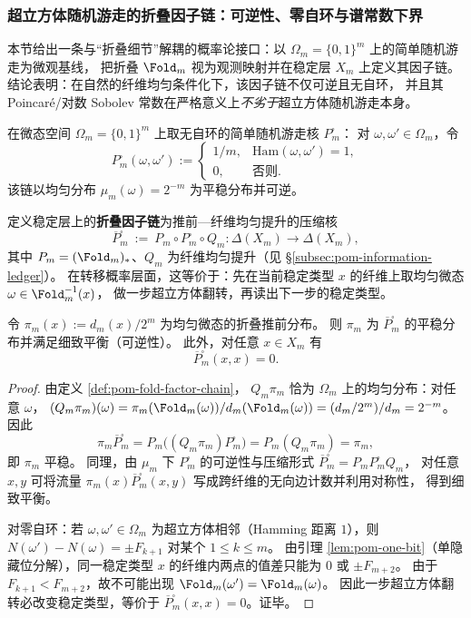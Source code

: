 \subsubsection{超立方体随机游走的折叠因子链：可逆性、零自环与谱常数下界}\label{subsubsec:pom-fold-factor-chain}

本节给出一条与“折叠细节”解耦的概率论接口：以 \(\Omega_m=\{0,1\}^m\) 上的简单随机游走为微观基线，
把折叠 \(\Fold_m\) 视为观测映射并在稳定层 \(X_m\) 上定义其因子链。
结论表明：在自然的纤维均匀条件化下，该因子链不仅可逆且无自环，
并且其 Poincar\'e/对数 Sobolev 常数在严格意义上\emph{不劣于}超立方体随机游走本身。

\begin{definition}[超立方体简单随机游走与折叠因子链]\label{def:pom-fold-factor-chain}
在微态空间 \(\Omega_m=\{0,1\}^m\) 上取无自环的简单随机游走核 \(P^{\square}_m\)：
对 \(\omega,\omega'\in\Omega_m\)，令
\[
P^{\square}_m(\omega,\omega')
:=
\begin{cases}
1/m,& \mathrm{Ham}(\omega,\omega')=1,\\
0,& \text{否则}.
\end{cases}
\]
该链以均匀分布 \(\mu_m(\omega)=2^{-m}\) 为平稳分布并可逆。
\par
定义稳定层上的\textbf{折叠因子链}为推前—纤维均匀提升的压缩核
\[
\overline P^{\square}_m\ :=\ P_m\circ P^{\square}_m\circ Q_m:\Delta(X_m)\to\Delta(X_m),
\]
其中 \(P_m=(\Fold_m)_*\)、\(Q_m\) 为纤维均匀提升（见 \S\ref{subsec:pom-information-ledger}）。
在转移概率层面，这等价于：先在当前稳定类型 \(x\) 的纤维上取均匀微态 \(\omega\in\Fold_m^{-1}(x)\)，
做一步超立方体翻转，再读出下一步的稳定类型。
\end{definition}

\begin{proposition}[可逆性与零自环]\label{prop:pom-fold-factor-chain-reversible-noloop}
令
\(
\pi_m(x):=d_m(x)/2^m
\)
为均匀微态的折叠推前分布。
则 \(\pi_m\) 为 \(\overline P^{\square}_m\) 的平稳分布并满足细致平衡（可逆性）。
此外，对任意 \(x\in X_m\) 有
\[
\overline P^{\square}_m(x,x)=0.
\]
\end{proposition}
\begin{proof}
由定义 \ref{def:pom-fold-factor-chain}，
\(
Q_m\pi_m
\)
恰为 \(\Omega_m\) 上的均匀分布：对任意 \(\omega\)，
\(
(Q_m\pi_m)(\omega)=\pi_m(\Fold_m(\omega))/d_m(\Fold_m(\omega))=(d_m/2^m)/d_m=2^{-m}
\)。
因此
\[
\pi_m\overline P^{\square}_m
=
P_m\bigl((Q_m\pi_m)P^{\square}_m\bigr)
=
P_m(Q_m\pi_m)
=\pi_m,
\]
即 \(\pi_m\) 平稳。
同理，由 \(\mu_m\) 下 \(P^{\square}_m\) 的可逆性与压缩形式 \(\overline P^{\square}_m=P_mP^{\square}_mQ_m\)，
对任意 \(x,y\) 可将流量 \(\pi_m(x)\overline P^{\square}_m(x,y)\) 写成跨纤维的无向边计数并利用对称性，
得到细致平衡。
\par
对零自环：若 \(\omega,\omega'\in\Omega_m\) 为超立方体相邻（Hamming 距离 \(1\)），则
\(
N(\omega')-N(\omega)=\pm F_{k+1}
\)
对某个 \(1\le k\le m\)。
由引理 \ref{lem:pom-one-bit}（单隐藏位分解），同一稳定类型 \(x\) 的纤维内两点的值差只能为 \(0\) 或 \(\pm F_{m+2}\)。
由于 \(F_{k+1}<F_{m+2}\)，故不可能出现 \(\Fold_m(\omega')=\Fold_m(\omega)\)。
因此一步超立方体翻转必改变稳定类型，等价于 \(\overline P^{\square}_m(x,x)=0\)。证毕。
\end{proof}

